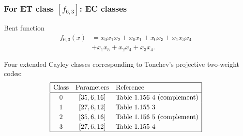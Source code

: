 \documentclass[pdf,sprung,slideColor,nocolorBG]{beamer}
\newenvironment{colortheme}[1]{
\def\ProvidesPackageRCS $##1${\relax}
\renewcommand{\ProcessOptions}{\relax}
\makeatletter

\makeatother
}{}
\begin{document}
\begin{colortheme}{jubata}
\begin{frame}
\begin{figure}
\begin{minipage}{.48\textwidth}
  \label{fig:6_2_bent_cayley_graph_index_matrix}
\end{minipage}
\end{figure}
\end{frame}
\begin{frame}
\frametitle{For ET class $[f_{6,3}]$: EC classes}

Bent function
\begin{align*}
f_{6,3}(x) &= x_{0} x_{1} x_{2} + x_{0} x_{1} + x_{0} x_{3} + x_{1} x_{3} x_{4}
\\
           &+ x_{1} x_{5} + x_{2} x_{4} + x_{3} x_{4}.
\end{align*}

Four extended Cayley classes corresponding to Tonchev's projective two-weight codes:
\begin{align*}
\def\arraystretch{1.2}
\begin{array}{|ccl|}
\hline
\text{Class} &
\text{Parameters} & \text{Reference}
\\
\hline
0 & [35,6,16] & \text{Table 1.156 4 (complement)}
\\
1 & [27,6,12] & \text{Table 1.155 3 }
\\
2 & [35,6,16] & \text{Table 1.156 5 (complement)}
\\
3 & [27,6,12] & \text{Table 1.155 4 }
\\
\hline
\end{array}
\end{align*}


\end{frame}
\end{colortheme}
\end{document}

